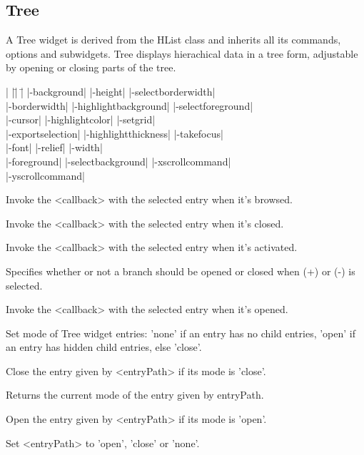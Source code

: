 \subsection*{Tree}
A Tree widget is derived from the HList class and
inherits all its commands, options and subwidgets.
Tree displays hierachical data in
a tree form, adjustable by
opening or closing parts of the tree.
\vskip5pt
\vspace{-4pt}

\begin{tabbing}
|                    |\=|                    |\= \kill                    
|-background|        \> |-height|             \> |-selectborderwidth| \\
|-borderwidth|       \> |-highlightbackground| \> |-selectforeground| \\
|-cursor|	     \> |-highlightcolor|     \> |-setgrid| \\         
|-exportselection|   \> |-highlightthickness| \> |-takefocus| \\
|-font|              \> |-relief|             \> |-width| \\           
|-foreground|        \> |-selectbackground|   \> |-xscrollcommand| \\  
\> \> |-yscrollcommand| \\  
\end{tabbing}

\vskip5pt
\begin{enum}{1cm}

 Invoke the <callback> with the selected entry
when it's browsed.

 Invoke the <callback> with the selected entry
when it's closed.

 Invoke the <callback> with the selected entry
when it's activated.

 Specifies whether or not a branch
should be opened or closed when (+) or (-) is selected.

 Invoke the <callback> with the selected entry
when it's opened.
\end{enum}

\vskip5pt

\begin{enum}{1cm}

Set mode of Tree widget entries: 'none' if an entry has no child
entries, 'open' if an entry has hidden child entries, else 'close'.

Close the entry given by <entryPath> if its mode is 'close'.

Returns the current mode of the entry given by
entryPath.

Open the entry given by <entryPath> if its mode is 'open'.

Set <entryPath> to 'open', 'close' or 'none'.

\end{enum}

